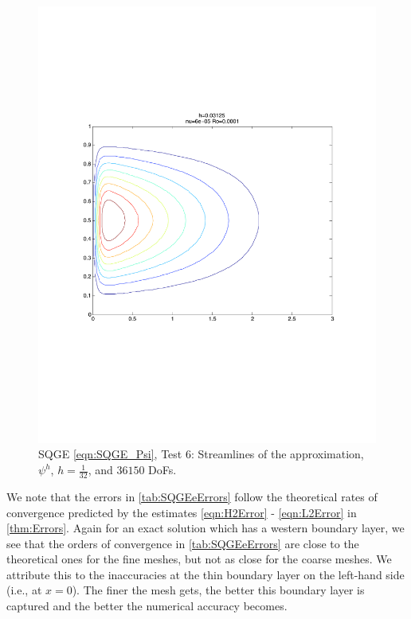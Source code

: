 \begin{figure}%
  \begin{center}
    \includegraphics[scale=0.5]{Figures/SQGEe.pdf}
    \caption{SQGE \eqref{eqn:SQGE_Psi}, Test 6: Streamlines of the approximation,
    $\psi^h$, $h=\frac{1}{32}$, and $36150$ DoFs.}
    \label{fig:SQGEe}
  \end{center}
\end{figure}

We note that the errors in \autoref{tab:SQGEeErrors} follow the theoretical
rates of convergence predicted by the estimates \eqref{eqn:H2Error} -
\eqref{eqn:L2Error} in \autoref{thm:Errors}. Again for an exact solution which
has a western boundary layer, we see that the orders of convergence in
\autoref{tab:SQGEeErrors} are close to the theoretical ones for the fine meshes,
but not as close for the coarse meshes. We attribute this to the inaccuracies at
the thin boundary layer on the left-hand side (i.e., at $x=0$). The finer the
mesh gets, the better this boundary layer is captured and the better the
numerical accuracy becomes.

